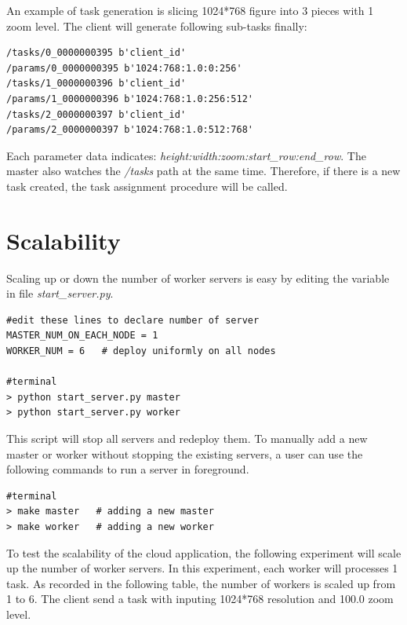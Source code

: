 \documentclass[runningheads,a4paper]{llncs}
\begin{document}
An example of task generation is slicing 1024*768 figure into 3 pieces with 1 zoom level. The client will generate following sub-tasks finally:
\begin{verbatim}
/tasks/0_0000000395 b'client_id'
/params/0_0000000395 b'1024:768:1.0:0:256'
/tasks/1_0000000396 b'client_id'
/params/1_0000000396 b'1024:768:1.0:256:512'
/tasks/2_0000000397 b'client_id'
/params/2_0000000397 b'1024:768:1.0:512:768'
\end{verbatim}

Each parameter data indicates: \emph{height:width:zoom:start\_row:end\_row}. The master also watches the \emph{/tasks} path at the same time. Therefore, if there is a new task created, the task assignment procedure will be called.

\section{Scalability}
Scaling up or down the number of worker servers is easy by editing the variable in file \emph{start\_server.py}. 

\begin{verbatim}
#edit these lines to declare number of server
MASTER_NUM_ON_EACH_NODE = 1  
WORKER_NUM = 6   # deploy uniformly on all nodes

#terminal
> python start_server.py master
> python start_server.py worker
\end{verbatim}
This script will stop all servers and redeploy them. To manually add a new master or worker without stopping the existing servers, a user can use the following commands to run a server in foreground.

\begin{verbatim}
#terminal
> make master   # adding a new master
> make worker   # adding a new worker
\end{verbatim}

To test the scalability of the cloud application, the following experiment will scale up the number of worker servers. In this experiment, each worker will processes 1 task. As recorded in the following table, the number of workers is scaled up from 1 to 6. The client send a task with inputing 1024*768 resolution and 100.0 zoom level.
\end{document}
